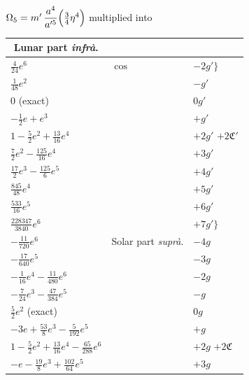 \documentclass[11pt]{article}
\begin{document}
\bigskip
{} $\Omega_{5} = m'\,\dfrac{a^{4}}{a'^{5}}\Bigl(\tfrac{3}{4}\eta^{4}\Bigr)$ multiplied into

\begin{center}
\begin{tabular}{|l|l|l|}
\hline
\multicolumn{1}{|c|}{Lunar part \textit{infr\`a}.} & & \\
\hline
$\tfrac{4}{24}e^{6}$                               & $\cos$ & $-2g'\bigr\}$ \\
$\tfrac{1}{48}e^{2}$                               &        & $-g'$ \\
$0$ (exact)                                        &        & $0g'$ \\
$-\tfrac{1}{2}e+e^{3}$                             &        & $+g'$ \\
$1-\tfrac{5}{2}e^{2}+\tfrac{13}{16}e^{4}$          &        & $+2g'$ \quad $+2\mathfrak{C}'$ \\
$\tfrac{7}{2}e^{2}-\tfrac{125}{16}e^{4}$           &        & $+3g'$ \\
$\tfrac{17}{2}e^{3}-\tfrac{125}{6}e^{5}$           &        & $+4g'$ \\
$\tfrac{845}{48}e^{4}$                             &        & $+5g'$ \\
$\tfrac{533}{16}e^{5}$                             &        & $+6g'$ \\
$\tfrac{228347}{3840}e^{6}$                        &        & $+7g'\bigr\}$ \\
\hline
$-\tfrac{11}{720}e^{6}$                                 & Solar part \textit{supr\`a}. & $-4g$ \\
$-\tfrac{17}{640}e^{5}$                                 &                              & $-3g$ \\
$-\tfrac{1}{16}e^{4}-\tfrac{11}{480}e^{6}$              &                              & $-2g$ \\
$-\tfrac{7}{24}e^{3}-\tfrac{47}{384}e^{5}$              &                              & $-g$ \\
$\tfrac{5}{2}e^{2}$ (exact)                             &                              & $0g$ \\
$-3e+\tfrac{53}{8}e^{3}-\tfrac{5}{192}e^{5}$            &                              & $+g$ \\
$1-\tfrac{5}{2}e^{2}+\tfrac{13}{16}e^{4}-\tfrac{65}{288}e^{6}$ & &                       $+2g$ \quad $+2\mathfrak{C}$ \\
$-e-\tfrac{19}{8}e^{3}+\tfrac{102}{64}e^{5}$            &                              & $+3g$ \\

\end{tabular}
\end{center}
\end{document}
